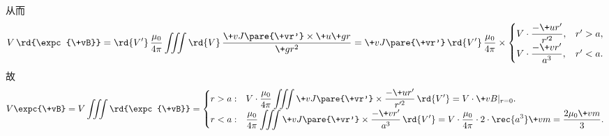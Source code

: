 \documentclass[hidelinks]{ctexart}
\begin{document}
从而
\[ V\,\rd{\expc{\+vB}} = \rd{V'}\, \frac{\mu_0}{4\pi}\iiint \rd{V}\, \frac{\+vJ\pare{\+vr'}\times \+u{\+gr}}{\+gr^2} = \+vJ\pare{\+vr'}\,\rd{V'}\,\frac{\mu_0}{4\pi} \times \begin{cases}
    \displaystyle V\cdot \frac{-\+ur'}{r'^2}, & r' > a, \\
    \displaystyle V\cdot \frac{-\+vr'}{a^3}, & r'< a.
\end{cases}  \]
故
\[ V\expc{\+vB} = V\iiint \rd{\expc{\+vB}} = \begin{cases}
    \displaystyle r>a: & \displaystyle V\cdot \frac{\mu_0}{4\pi} \iiint \+vJ\pare{\+vr'}\times \frac{-\+ur'}{r'^2}\,\rd{V'} = V\cdot \+vB\vert_{r=0}. \\
    \displaystyle r<a: & \displaystyle \frac{\mu_0}{4\pi} \iiint \+vJ\pare{\+vr'}\times \frac{-\+vr'}{a^3}\,\rd{V'} = V\cdot \frac{\mu_0}{4\pi} \cdot 2\cdot \rec{a^3} \+vm = \frac{2\mu_0 \+vm}{3}.
\end{cases} \]
\end{document}
